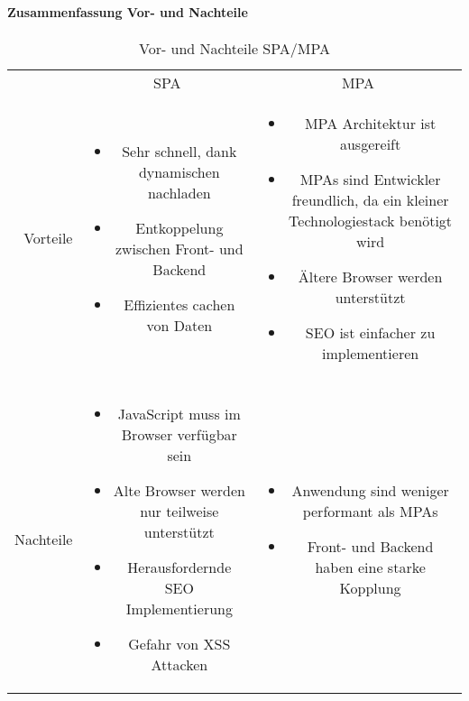 \paragraph{Zusammenfassung Vor- und Nachteile} \label{para:Zusammenfassung_Vor-_und_Nachteile}
\mbox{} %
\begin{table}[htb]
	\centering
	\begin{tabular}{rcc}
		& SPA & MPA \\
		Vorteile &
		\begin{minipage}[t]{0.4\textwidth}
			\begin{itemize}
				\item Sehr schnell, dank dynamischen nachladen
				\item Entkoppelung zwischen Front- und Backend
				\item Effizientes cachen von Daten
			\end{itemize}
		\end{minipage} &
		\begin{minipage}[t]{0.4\textwidth}
			\begin{itemize}
				\item MPA Architektur ist ausgereift
				\item MPAs sind Entwickler freundlich, da ein kleiner Technologiestack benötigt wird
				\item Ältere Browser werden unterstützt
				\item SEO ist einfacher zu implementieren
			\end{itemize}
		\end{minipage}\\
		& & \\ %
		Nachteile &
		\begin{minipage}[t]{0.4\textwidth}
			\begin{itemize}
				\item JavaScript muss im Browser verfügbar sein
				\item Alte Browser werden nur teilweise unterstützt
				\item Herausfordernde SEO Implementierung
				\item Gefahr von XSS Attacken
			\end{itemize}
		\end{minipage} &
		\begin{minipage}[t]{0.4\textwidth}
			\begin{itemize}
				\item Anwendung sind weniger performant als MPAs
				\item Front- und Backend haben eine starke Kopplung
			\end{itemize}
		\end{minipage}
	\end{tabular}
\caption{Vor- und Nachteile SPA/MPA}
\label{tab:Vor-_und_Nachteile_SPA/MPA}
\end{table}

